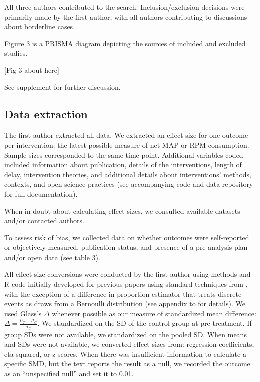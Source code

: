 \documentclass[sn-nature,referee,pdflatex]{sn-jnl}
\begin{document}
All three authors contributed to the search. Inclusion/exclusion
decisions were primarily made by the first author, with all authors
contributing to discussions about borderline cases.

Figure 3 is a PRISMA diagram depicting the sources of included and
excluded studies.

\begin{center}
[Fig 3 about here]
\end{center}

See supplement for further discussion.

\subsection{Data extraction}\label{sec3.3}

The first author extracted all data. We extracted an effect size for one
outcome per intervention: the latest possible measure of net MAP or RPM
consumption. Sample sizes corresponded to the same time point.
Additional variables coded included information about publication,
details of the interventions, length of delay, intervention theories,
and additional details about interventions' methods, contexts, and open
science practices (see accompanying code and data repository for full
documentation).

When in doubt about calculating effect sizes, we consulted available
datasets and/or contacted authors.

To assess risk of bias, we collected data on whether outcomes were
self-reported or objectively measured, publication status, and presence
of a pre-analysis plan and/or open data (see table 3).

All effect size conversions were conducted by the first author using
methods and R code initially developed for previous papers
\citep{paluck2019, paluck2021, porat2024} using standard techniques from
\citep{cooper2019}, with the exception of a difference in proportion
estimator that treats discrete events as draws from a Bernoulli
distribution (see appendix to \citep{paluck2021} for details). We used
Glass's \(\Delta\) whenever possible as our measure of standardized mean
difference: \(\Delta = \frac{\mu_T - \mu_C}{\sigma_C}\). We standardized
on the SD of the control group at pre-treatment. If group SDs were not
available, we standardized on the pooled SD. When means and SDs were not
available, we converted effect sizes from: regression coefficients, eta
squared, or z scores. When there was insufficient information to
calculate a specific SMD, but the text reports the result as a null, we
recorded the outcome as an ``unspecified null'' and set it to 0.01.
\end{document}
